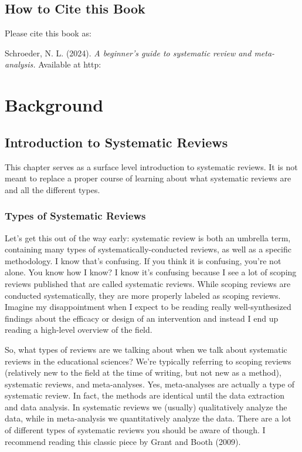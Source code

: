 \documentclass[
]{book}
\begin{document}
\hypertarget{how-to-cite-this-book}{%
\chapter*{How to Cite this Book}\label{how-to-cite-this-book}}

Please cite this book as:

Schroeder, N. L. (2024). \emph{A beginner's guide to systematic review and meta-analysis.} Available at http:

\hypertarget{part-background}{%
\part{Background}\label{part-background}}

\hypertarget{introduction-to-systematic-reviews}{%
\chapter{Introduction to Systematic Reviews}\label{introduction-to-systematic-reviews}}

This chapter serves as a surface level introduction to systematic reviews. It is not meant to replace a proper course of learning about what systematic reviews are and all the different types.

\hypertarget{types-of-systematic-reviews}{%
\section{Types of Systematic Reviews}\label{types-of-systematic-reviews}}

Let's get this out of the way early: systematic review is both an umbrella term, containing many types of systematically-conducted reviews, as well as a specific methodology. I know that's confusing. If you think it is confusing, you're not alone. You know how I know? I know it's confusing because I see a lot of scoping reviews published that are called systematic reviews. While scoping reviews are conducted systematically, they are more properly labeled as scoping reviews. Imagine my disappointment when I expect to be reading really well-synthesized findings about the efficacy or design of an intervention and instead I end up reading a high-level overview of the field.

So, what types of reviews are we talking about when we talk about systematic reviews in the educational sciences? We're typically referring to scoping reviews (relatively new to the field at the time of writing, but not new as a method), systematic reviews, and meta-analyses. Yes, meta-analyses are actually a type of systematic review. In fact, the methods are identical until the data extraction and data analysis. In systematic reviews we (usually) qualitatively analyze the data, while in meta-analysis we quantitatively analyze the data. There are a lot of different types of systematic reviews you should be aware of though. I recommend reading this classic piece by Grant and Booth (2009)\citep{grant2009}.
\end{document}
